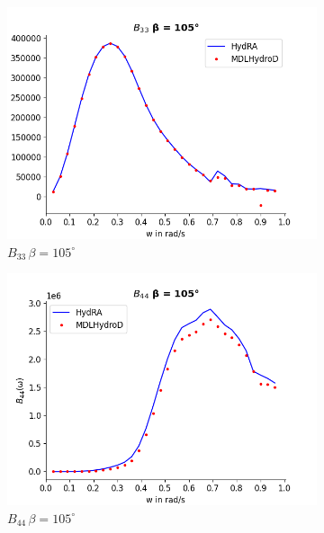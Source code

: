 \begin{figure}[H]
\begin{subfigure}[b]{0.49\textwidth}
    \end{subfigure}
    \vspace{5pt}%
    \begin{subfigure}[b]{0.49\textwidth}
        \includegraphics[width=\textwidth]{plots/kvlcc/radiation_damp/b33.png}
        \caption{$B_{33}\, \beta = 105^{\circ}$}
    \end{subfigure}
    \begin{subfigure}[b]{0.49\textwidth}
        \includegraphics[width=\textwidth]{plots/kvlcc/radiation_damp/b44.png}
        \caption{$B_{44} \, \beta = 105^{\circ}$}
    \end{subfigure}
    \vspace{5pt}%
    \begin{subfigure}[b]{0.49\textwidth}

\end{subfigure}
\end{figure}
